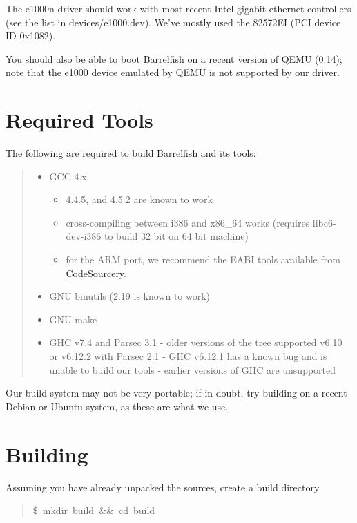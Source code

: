 The e1000n driver should work with most recent Intel gigabit ethernet
controllers (see the list in devices/e1000.dev). We've mostly used the
82572EI (PCI device ID 0x1082).

You should also be able to boot Barrelfish on a recent version of QEMU (0.14);
note that the e1000 device emulated by QEMU is not supported by our driver.


\section{Required Tools%
  \label{required-tools}%
}

The following are required to build Barrelfish and its tools:
%
\begin{quote}
%
\begin{itemize}

\item GCC 4.x
%
\begin{itemize}

\item 4.4.5, and 4.5.2 are known to work

\item cross-compiling between i386 and x86\_64 works (requires libc6-dev-i386
to build 32 bit on 64 bit machine)

\item for the ARM port, we recommend the EABI tools available from \href{http://www.codesourcery.com/sgpp/lite/arm}{CodeSourcery}.

\end{itemize}

\item GNU binutils (2.19 is known to work)

\item GNU make

\item GHC v7.4 and Parsec 3.1
- older versions of the tree supported v6.10 or v6.12.2 with Parsec 2.1
- GHC v6.12.1 has a known bug and is unable to build our tools
- earlier versions of GHC are unsupported

\end{itemize}

\end{quote}

Our build system may not be very portable; if in doubt, try building on a
recent Debian or Ubuntu system, as these are what we use.


\section{Building%
  \label{building}%
}
\begin{list}{.}
{
\setlength{\rightmargin}{\leftmargin}
}

\item Assuming you have already unpacked the sources, create a build directory
%
\begin{quote}{\ttfamily \raggedright \noindent
\$~mkdir~build~\&\&~cd~build
}
\end{quote}
\end{list}

